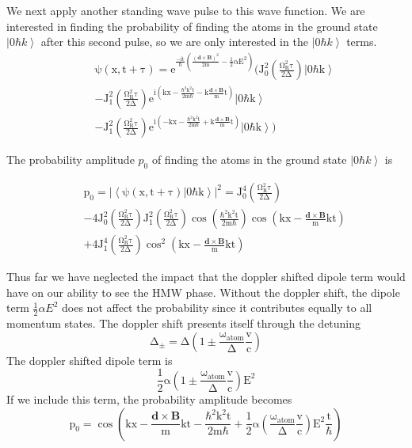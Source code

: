 \documentclass[twocolumn,english,pra,aps,superscriptaddress,floatfix]{revtex4-1}
\begin{document}
We next apply another standing wave pulse to this wave function. We are interested in finding the probability of finding the atoms in the ground state $\left|0\hbar k\right>$ after this second pulse, so we are only interested in the $\left|0\hbar k\right>$ terms.
\begin{eqnarray}
&&\mathrm{\psi(x,t+\tau)=\mathrm{e^{\frac{-it}{\hbar}\left(\frac{\left(\mathbf{d}\times\mathbf{B}\right)^2}{2m}-\frac{1}{2}\alpha E^2\right)}\bigg(J_0^2\left(\frac{\Omega_R^2\tau}{2\Delta}\right)\left|0\hbar k\right>}}\nonumber \\
&&-\mathrm{J_1^2\left(\frac{\Omega_R^2\tau}{2\Delta}\right)e^{i\left(kx-\frac{\hbar^2k^2t}{2m\hbar}-k\frac{\mathbf{d}\times\mathbf{B}}{m}t\right)}\left|0\hbar k\right>}\nonumber \\
&&-\mathrm{J_1^2\left(\frac{\Omega_R^2\tau}{2\Delta}\right)e^{i\left(-kx-\frac{\hbar^2k^2t}{2m\hbar}+k\frac{\mathbf{d}\times\mathbf{B}}{m}t\right)}\left|0\hbar k\right>\bigg)}
\end{eqnarray}

The probability amplitude $p_0$ of finding the atoms in the ground state $\left|0\hbar k\right>$ is

\begin{eqnarray}
&&\mathrm{p_0=|\left<\psi(x,t+\tau)|0\hbar k\right>|^2=J_0^4\left(\frac{\Omega_R^2\tau}{2\Delta}\right)}\nonumber \\
&&\mathrm{-4J_0^2\left(\frac{\Omega_R^2\tau}{2\Delta}\right)J_1^2\left(\frac{\Omega_R^2\tau}{2\Delta}\right)\cos{\left(\frac{\hbar^2k^2t}{2m\hbar}\right)}\cos{\left(kx-\frac{\mathbf{d}\times\mathbf{B}}{m}kt\right)}} \nonumber \\
&&\mathrm{+4J_1^4\left(\frac{\Omega_R^2\tau}{2\Delta}\right)\cos^2{\left(kx-\frac{\mathbf{d}\times\mathbf{B}}{m}kt\right)}}
\end{eqnarray}

Thus far we have neglected the impact that the doppler shifted dipole term would have on our ability to see the HMW phase.  Without the doppler shift, the dipole term $\frac{1}{2}\alpha E^2$ does not affect the probability since it contributes equally to all momentum states.  The doppler shift presents itself through the detuning 
\begin{equation}
\mathrm{\Delta_{\pm}=\Delta\left(1\pm \frac{\omega_{atom}}{\Delta}\frac{v}{c}\right)}
\end{equation}
The doppler shifted dipole term is
\begin{equation}
\mathrm{\frac{1}{2}\alpha\left(1\pm \frac{\omega_{atom}}{\Delta}\frac{v}{c}\right)E^2}
\end{equation}
If we include this term, the probability amplitude becomes
\begin{equation}
\mathrm{p_0=\cos{\left(kx-\frac{\mathbf{d}\times\mathbf{B}}{m}kt-\frac{\hbar^2k^2t}{2m\hbar}+\frac{1}{2}\alpha\left(\frac{\omega_{atom}}{\Delta}\frac{v}{c}\right)E^2\frac{t}{\hbar}\right)}}
\end{equation}
\end{document}
